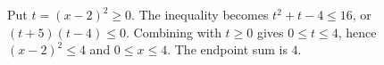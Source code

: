 Put $t=(x-2)^2\ge0$. The inequality becomes $t^2+t-4\le16$, or $(t+5)(t-4)\le0$. Combining with $t\ge0$ gives $0\le t\le4$, hence $(x-2)^2\le4$ and $0\le x\le4$. The endpoint sum is $\boxed4$.
